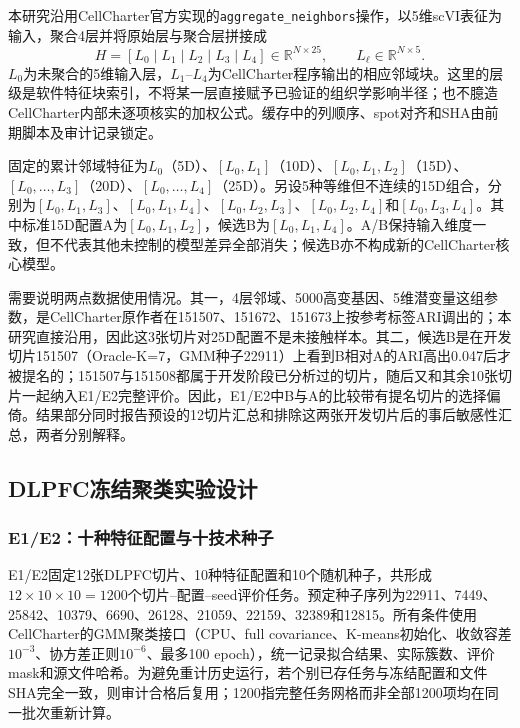 本研究沿用CellCharter官方实现的\texttt{aggregate\_neighbors}操作，以5维scVI表征为输入，聚合4层并将原始层与聚合层拼接成
\begin{equation}
H=[L_0\mid L_1\mid L_2\mid L_3\mid L_4]
\in\mathbb{R}^{N\times25},\qquad
L_\ell\in\mathbb{R}^{N\times5}.
\label{eq:cc-H-v1}
\end{equation}
$L_0$为未聚合的5维输入层，$L_1$--$L_4$为CellCharter程序输出的相应邻域块。这里的层级是软件特征块索引，不将某一层直接赋予已验证的组织学影响半径；也不臆造CellCharter内部未逐项核实的加权公式。缓存中的列顺序、spot对齐和SHA由前期脚本及审计记录锁定。

固定的累计邻域特征为$L_0$（5D）、$[L_0,L_1]$（10D）、$[L_0,L_1,L_2]$（15D）、$[L_0,\ldots,L_3]$（20D）、$[L_0,\ldots,L_4]$（25D）。另设5种等维但不连续的15D组合，分别为$[L_0,L_1,L_3]$、$[L_0,L_1,L_4]$、$[L_0,L_2,L_3]$、$[L_0,L_2,L_4]$和$[L_0,L_3,L_4]$。其中标准15D配置A为$[L_0,L_1,L_2]$，候选B为$[L_0,L_1,L_4]$。A/B保持输入维度一致，但不代表其他未控制的模型差异全部消失；候选B亦不构成新的CellCharter核心模型。

需要说明两点数据使用情况。其一，4层邻域、5000高变基因、5维潜变量这组参数，是CellCharter原作者在151507、151672、151673上按参考标签ARI调出的\cite{varrone2024}；本研究直接沿用，因此这3张切片对25D配置不是未接触样本。其二，候选B是在开发切片151507（Oracle-K=7，GMM种子22911）上看到B相对A的ARI高出0.047后才被提名的；151507与151508都属于开发阶段已分析过的切片，随后又和其余10张切片一起纳入E1/E2完整评价。因此，E1/E2中B与A的比较带有提名切片的选择偏倚。结果部分同时报告预设的12切片汇总和排除这两张开发切片后的事后敏感性汇总，两者分别解释。

\subsection{DLPFC冻结聚类实验设计}
\label{subsec:cc-dlpfc-protocol-v1}

\subsubsection{E1/E2：十种特征配置与十技术种子}
E1/E2固定12张DLPFC切片、10种特征配置和10个随机种子，共形成$12\times10\times10=1200$个切片--配置--seed评价任务。预定种子序列为22911、7449、25842、10379、6690、26128、21059、22159、32389和12815。所有条件使用CellCharter的GMM聚类接口（CPU、full covariance、K-means初始化、收敛容差$10^{-3}$、协方差正则$10^{-6}$、最多100 epoch），统一记录拟合结果、实际簇数、评价mask和源文件哈希。为避免重计历史运行，若个别已存任务与冻结配置和文件SHA完全一致，则审计合格后复用；1200指完整任务网格而非全部1200项均在同一批次重新计算。

